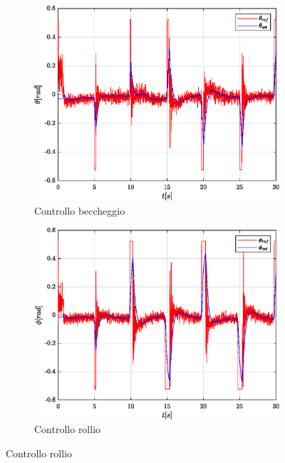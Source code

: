 \begin{figure}
	\centering
	\begin{subfigure}{0.45\textwidth}
		\centering
		\includegraphics[width=1\textwidth]{Simulazioni/Figure/PID/BUTTERFLY/AttitudeControlPitch}
		\caption{Controllo beccheggio}
		\label{fig:BUTTERFLYerrbecPID}
	\end{subfigure}
	\hfill
	\begin{subfigure}{0.45\textwidth}
		\centering
		\includegraphics[width=1\textwidth]{Simulazioni/Figure/PID/BUTTERFLY/AttitudeControlRoll}
		\caption{Controllo rollio}
		\label{fig:BUTTERFLYerrrolPID}
	\end{subfigure}

\end{figure}
